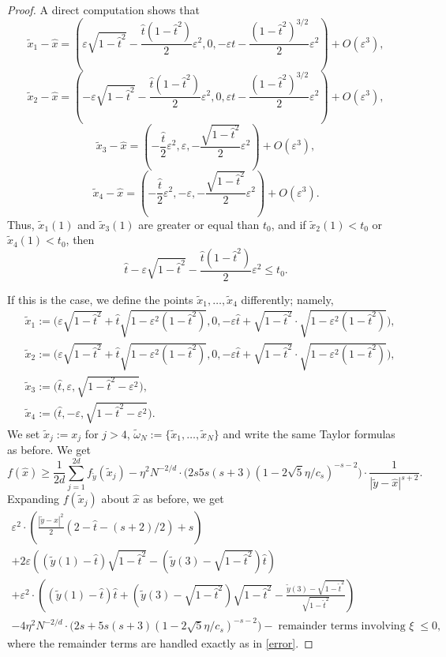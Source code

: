 \documentclass[12pt]{amsart}
\theoremstyle{definition}
\def\sli{\sum\limits}
\def\ep{\varepsilon}
\newcommand{\1}{\mathbf{1}}
\begin{document}
\begin{proof}
A direct computation shows that
$$
\tilde{x}_1-\hat{x} = \left(\ep \sqrt{1-\hat{t}^2}-\frac{\hat t(1-\hat{t}^2)}2\ep^2, 0, -\ep t - \frac{(1-\hat{t}^2)^{3/2}}{2}\ep^2\right) + O(\ep^3),
$$
$$
\tilde{x}_2-\hat{x} = \left(-\ep \sqrt{1-\hat{t}^2}-\frac{\hat t(1-\hat{t}^2)}2\ep^2, 0, \ep t - \frac{(1-\hat{t}^2)^{3/2}}{2}\ep^2\right) + O(\ep^3),
$$
$$
\tilde{x}_3-\hat{x}=\left(-\frac{\hat{t}}2\ep^2, \ep, -\frac{\sqrt{1-\hat t^2}}2\ep^2\right)+O(\ep^3),
$$
$$
\tilde{x}_4-\hat{x}=\left(-\frac{\hat{t}}2\ep^2, -\ep, -\frac{\sqrt{1-\hat t^2}}2\ep^2\right)+O(\ep^3).
$$
Thus, $\tilde{x}_1(1)$ and $\tilde{x}_3(1)$ are greater or equal than $t_0$, and if $\tilde{x}_2(1)<t_0$ or $\tilde{x}_4(1)<t_0$, then
\begin{equation}\label{capnearboundary}
\hat{t}-\ep \sqrt{1-\hat{t}^2}-\frac{\hat t(1-\hat{t}^2)}2\ep^2\leqslant t_0.
\end{equation}

If this is the case, we define the points $\tilde{x}_1, \ldots, \tilde{x}_4$ differently; namely,
\begin{align*}
&\tilde{x}_1:=\Big(\ep \sqrt{1-\hat{t}^2}+\hat{t}\sqrt{1-\ep^2(1-\hat{t}^2)}, 0, -\ep \hat{t}+\sqrt{1-\hat{t}^2}\cdot\sqrt{1-\ep^2(1-\hat{t}^2)}\Big), \\
&\tilde{x}_2:=\Big(\ep \sqrt{1-\hat{t}^2}+\hat{t}\sqrt{1-\ep^2(1-\hat{t}^2)}, 0, -\ep \hat{t}+\sqrt{1-\hat{t}^2}\cdot\sqrt{1-\ep^2(1-\hat{t}^2)}\Big),\\
& \tilde{x}_3:=\Big(\hat{t}, \ep, \sqrt{1-\hat{t}^2-\ep^2}\Big), \\
&\tilde{x}_4:=\Big(\hat{t}, -\ep, \sqrt{1-\hat{t}^2-\ep^2}\Big).
\end{align*}
We set $\tilde{x}_j:=x_j$ for $j>4$, $\widetilde{\omega}_N:=\{\tilde{x}_1, \ldots, \tilde{x}_N\}$ and write the same Taylor formulas as before. We get
\begin{equation}
f(\hat{x}) \geqslant \frac{1}{2d}\sli_{j=1}^{2d}f_{\tilde{y}}(\tilde{x}_j) - \eta^2 N^{-2/d}\cdot \Big(2s5s (s+3)(1-2\sqrt{5}\eta/c_s)^{-s-2}\Big)\cdot \frac{1}{|\tilde{y}-\hat{x}|^{s+2}}.
\end{equation}
Expanding $f(\tilde{x}_j)$ about $\hat{x}$ as before, we get
\begin{multline}\label{hessianhessian}
\ep^2\cdot \left(\frac{|\tilde{y}-\hat{x}|^2}{2}(2-\hat t - (s+2)/2)+s\right)  \\
+ 2\ep\left((\tilde{y}(1)-\hat t)\sqrt{1-\hat t^2}-(\tilde{y}(3)-\sqrt{1-\hat t^2})\hat{t}\right)  \\
+\ep^2\cdot \left((\tilde{y}(1)-\hat t)\hat{t}+(\tilde{y}(3)-\sqrt{1-\hat{t}^2})\sqrt{1-\hat t^2} - \frac{\tilde{y}(3)-\sqrt{1-\hat{t}^2}}{\sqrt{1-\hat{t}^2}}\right) 
\\ -4\eta^2 N^{-2/d}\cdot \Big(2s+5s (s+3)(1-2\sqrt{5}\eta/c_s)^{-s-2}\Big) - \; \mbox{remainder terms involving $\xi$} \; \leqslant 0,
\end{multline}
where the remainder terms are handled exactly as in \eqref{error}.


\end{proof}
\end{document}
